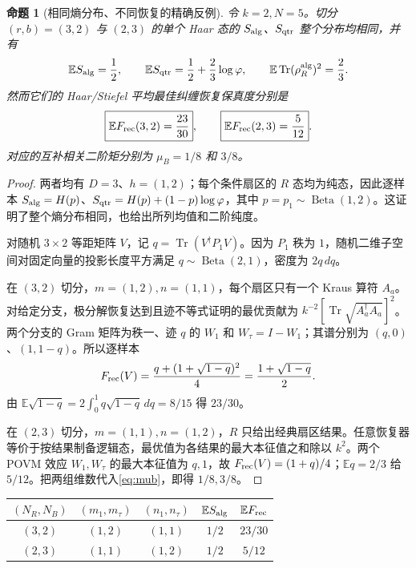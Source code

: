 \documentclass[UTF8,a4paper,11pt]{ctexart}
\newtheorem{proposition}{命题}
\DeclareMathOperator{\Tr}{Tr}
\DeclareMathOperator{\Beta}{Beta}
\newcommand{\EE}{\mathbb E}
\newcommand{\ph}{\varphi}
\begin{document}
\begin{proposition}[相同熵分布、不同恢复的精确反例]\label{prop:counter}
令 $k=2,N=5$。切分 $(r,b)=(3,2)$ 与 $(2,3)$ 的单个 Haar 态的 $S_{\rm alg}$、$S_{\rm qtr}$ \emph{整个分布}均相同，并有
\begin{equation}
 \EE S_{\rm alg}=\frac12,\qquad
 \EE S_{\rm qtr}=\frac12+\frac23\log\ph,\qquad
 \EE\Tr(\rho_R^{\rm alg})^2=\frac23.
\end{equation}
然而它们的 Haar/Stiefel 平均最佳纠缠恢复保真度分别是
\begin{equation}\label{eq:smallF}
 \boxed{\EE F_{\rm rec}(3,2)=\frac{23}{30}},\qquad
 \boxed{\EE F_{\rm rec}(2,3)=\frac5{12}}.
\end{equation}
对应的互补相关二阶矩分别为 $\mu_B=1/8$ 和 $3/8$。
\end{proposition}
\begin{proof}
两者均有 $D=3$、$h=(1,2)$；每个条件扇区的 $R$ 态均为纯态，因此逐样本
$S_{\rm alg}=H(p)$、$S_{\rm qtr}=H(p)+(1-p)\log\ph$，其中
$p=p_1\sim\Beta(1,2)$。这证明了整个熵分布相同，也给出所列均值和二阶纯度。

对随机 $3\times2$ 等距矩阵 $V$，记
$q=\Tr(V^\dagger P_1V)$。因为 $P_1$ 秩为 $1$，随机二维子空间对固定向量的投影长度平方满足 $q\sim\Beta(2,1)$，密度为 $2q\,dq$。

在 $(3,2)$ 切分，$m=(1,2),n=(1,1)$，每个扇区只有一个 Kraus 算符 $A_a$。对给定分支，极分解恢复达到且迹不等式证明的最优贡献为
$k^{-2}[\Tr\sqrt{A_a^\dagger A_a}]^2$。两个分支的 Gram 矩阵为秩一、迹 $q$ 的 $W_1$ 和 $W_\tau=I-W_1$；其谱分别为 $(q,0)$、$(1,1-q)$。所以逐样本
\begin{equation*}
 F_{\rm rec}(V)=\frac{q+(1+\sqrt{1-q})^2}{4}
 =\frac{1+\sqrt{1-q}}2.
\end{equation*}
由 $\EE\sqrt{1-q}=2\int_0^1q\sqrt{1-q}\,dq=8/15$ 得 $23/30$。

在 $(2,3)$ 切分，$m=(1,1),n=(1,2)$，$R$ 只给出经典扇区结果。任意恢复器等价于按结果制备逻辑态，最优值为各结果的最大本征值之和除以 $k^2$。两个 POVM 效应 $W_1,W_\tau$ 的最大本征值为 $q,1$，故
$F_{\rm rec}(V)=(1+q)/4$；$\EE q=2/3$ 给 $5/12$。把两组维数代入\eqref{eq:mub}，即得 $1/8,3/8$。
\end{proof}

\begin{center}
\begin{tabular}{@{}ccccc@{}}
\toprule
$(N_R,N_B)$ & $(m_1,m_\tau)$ & $(n_1,n_\tau)$ & $\EE S_{\rm alg}$ & $\EE F_{\rm rec}$\\
\midrule
$(3,2)$ & $(1,2)$ & $(1,1)$ & $1/2$ & $23/30$\\
$(2,3)$ & $(1,1)$ & $(1,2)$ & $1/2$ & $5/12$\\
\bottomrule
\end{tabular}
\end{center}
\end{document}
